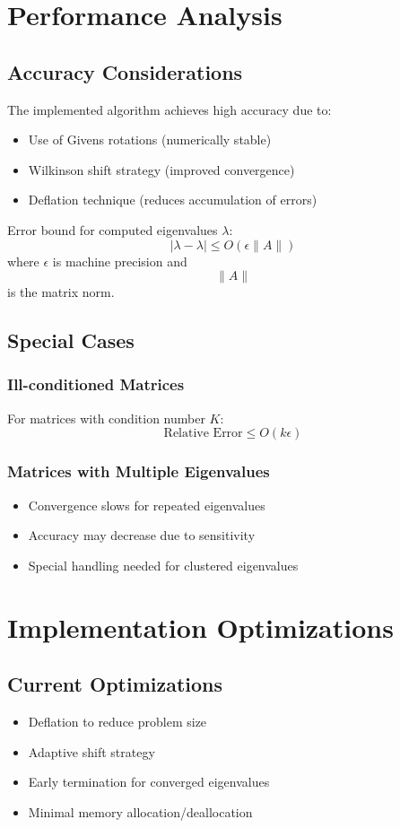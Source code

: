 \documentclass{article}
\begin{document}
\section{Performance Analysis}

\subsection{Accuracy Considerations}
The implemented algorithm achieves high accuracy due to:
\begin{itemize}
    \item Use of Givens rotations (numerically stable)
    \item Wilkinson shift strategy (improved convergence)
    \item Deflation technique (reduces accumulation of errors)
\end{itemize}

Error bound for computed eigenvalues $\lambda$:
\[ |\lambda - \lambda| \leq O(\epsilon\|A\|) \]
where $\epsilon$ is machine precision and\[ \|A\| \]is the matrix norm.

\subsection{Special Cases}

\subsubsection{Ill-conditioned Matrices}
For matrices with condition number $K$:
\[ \text{Relative Error} \leq O(k\epsilon) \]

\subsubsection{Matrices with Multiple Eigenvalues}
\begin{itemize}
    \item Convergence slows for repeated eigenvalues
    \item Accuracy may decrease due to sensitivity
    \item Special handling needed for clustered eigenvalues
\end{itemize}

\section{Implementation Optimizations}

\subsection{Current Optimizations}
\begin{itemize}
    \item Deflation to reduce problem size
    \item Adaptive shift strategy
    \item Early termination for converged eigenvalues
    \item Minimal memory allocation/deallocation
\end{itemize}
\end{document}
